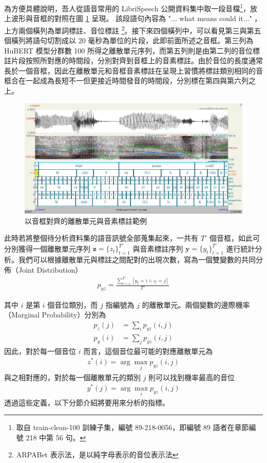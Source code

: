 {        為方便具體說明，吾人從語音常用的 LibriSpeech \cite{panayotov_librispeech_2015} 公開資料集中取一段音檔\footnote{取自 train-clean-100 訓練子集，編號 89-218-0056，即編號 89 語者在章節編號 218 中第 56 句。}，放上波形與音框的對照在圖 \ref{fig:enter-labelwav} 呈現。 該段語句內容為 "... what means could it..." ，上方兩個橫列為單詞標註、音位標註 \footnote{ARPABet 表示法，是以純字母表示的音位表示法}。接下來四個橫列中，可以看見第三與第五個橫列將語句切割成以 20 毫秒為單位的片段，此即前面所述之音框。第三列為 HuBERT 模型分群數 100 所得之離散單元序列，而第五列則是由第二列的音位標註片段按照所對應的時間段，分別對齊到音框上的音素標註。由於音位的長度通常長於一個音框，因此在離散單元和音框音素標註在呈現上習慣將標註類別相同的音框合在一起成為長短不一但更接近時間發音的時間段，分別標在第四與第六列之上。
        \begin{figure}
            \centering
            \includegraphics[width=1\linewidth]{figures/praat.png}
            \caption{以音框對齊的離散單元與音素標註範例}
            \label{fig:enter-labelwav}
        \end{figure}
        
        此時若將整個待分析資料集的語音訊號全部蒐集起來，一共有 $T'$ 個音框，如此可分別獲得一個離散單元序列 $\boldsymbol{z} = \{z_t\}_{t=1}^{T'}$ 與音素標註序列 $\boldsymbol{y} = \{y_t\}_{t=1}^{T'}$ 進行統計分析。我們可以根據離散單元與標註之間配對的出現次數，寫為一個雙變數的共同分佈（Joint Distribution）
\begin{align}
    p_{yz} = \frac{\sum^{T'}_{t=1}[{y_t = i \wedge z_t = j}]}{T'}
\end{align}

其中 $i$ 是第 $i$ 個音位類別，而 $j$ 指編號為 $j$ 的離散單元。兩個變數的邊際機率（Marginal Probability）分別為
\begin{align}
    p_z(j) & =\sum_i{p_{yz}(i, j)} \\
    p_y(i) & =\sum_j{p_{yz}(i, j)}
\end{align}
因此，對於每一個音位 $i$ 而言，這個音位最可能的對應離散單元為
\begin{align}
    z^\ast(i) = \arg\max_j p_{yz}(i, j)
\end{align}
與之相對應的，對於每一個離散單元的類別 $j$ 則可以找到機率最高的音位
\begin{align}
    y^\ast(j) = \arg\max_i p_{yz}(i,j)
\end{align}
透過這些定義，以下分節介紹將要用來分析的指標。

}
